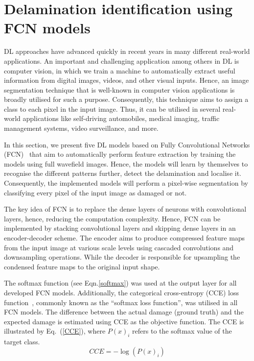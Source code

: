 \section{Delamination identification using FCN models}
\label{sec43}
DL approaches have advanced quickly in recent years in many different real-world applications.
An important and challenging application among others in DL is computer vision, in which we train a machine to automatically extract useful information from digital images, videos, and other visual inputs.
Hence, an image segmentation technique that is well-known in computer vision applications is broadly utilised for such a purpose.
Consequently, this technique aims to assign a class to each pixel in the input image.
Thus, it can be utilised in several real-world applications like self-driving automobiles, medical imaging, traffic management systems, video surveillance, and more.

In this section, we present five DL models based on Fully Convolutional Networks (FCN)~\cite{Shelhamer2017} that aim to automatically perform feature extraction by training the models using full wavefield images. 
Hence, the models will learn by themselves to recognise the different patterns further, detect the delamination and localise it.
Consequently, the implemented models will perform a pixel-wise segmentation by classifying every pixel of the input image as damaged or not.

The key idea of FCN is to replace the dense layers of neurons with convolutional layers, hence, reducing the computation complexity.
Hence, FCN can be implemented by stacking convolutional layers and skipping dense layers in an encoder-decoder scheme.
The encoder aims to produce compressed feature maps from the input image at various scale levels using cascaded convolutions and downsampling operations.
While the decoder is responsible for upsampling the condensed feature maps to the original input shape.

The softmax function (see Eqn.\ref{softmax}) was used at the output layer for all developed FCN models.
Additionally, the categorical cross-entropy (CCE) loss function~\cite{Bonaccorso2020}, commonly known as the \enquote{softmax loss function}, was utilised in all FCN models.
The difference between the actual damage (ground truth) and the expected damage is estimated using CCE as the objective function.
The CCE is illustrated by Eq.~(\ref{CCE}), where \( P(x)_{i}\) refers to the softmax value of the target class.
\begin{equation}	
	CCE = -\log\left( P(x)_{i} \right)
	\label{CCE}
\end{equation}

